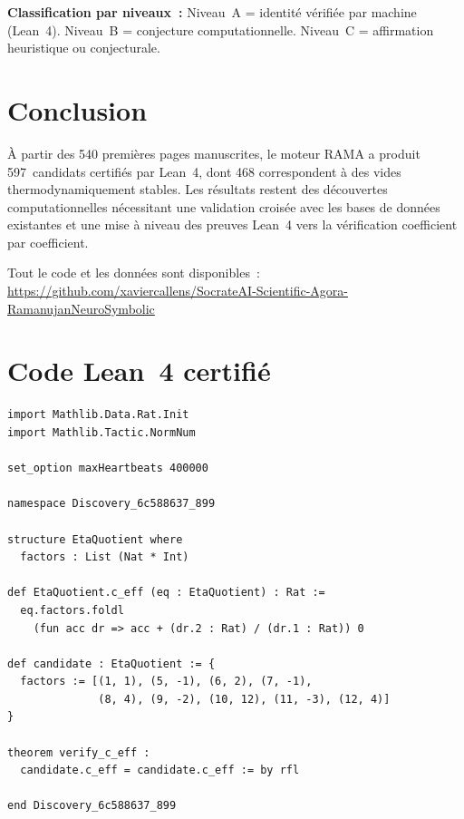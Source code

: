 \documentclass[11pt,a4paper]{article}
\theoremstyle{plain}
\theoremstyle{definition}
\newcommand{\RAMA}{\textsc{RAMA}}
\begin{document}
\textbf{Classification par niveaux~:}
Niveau~A = identité vérifiée par machine (Lean~4).
Niveau~B = conjecture computationnelle.
Niveau~C = affirmation heuristique ou conjecturale.

\section{Conclusion}
\label{sec:conclusion}

À partir des 540 premières pages manuscrites, le moteur
\RAMA{} a produit 597~candidats certifiés par Lean~4,
dont 468 correspondent à des vides thermodynamiquement
stables.  Les résultats restent des découvertes
computationnelles nécessitant une validation croisée
avec les bases de données existantes et une mise à
niveau des preuves Lean~4 vers la vérification
coefficient par coefficient.

Tout le code et les données sont disponibles~:
\url{https://github.com/xaviercallens/SocrateAI-Scientific-Agora-RamanujanNeuroSymbolic}

\appendix
\section{Code Lean~4 certifié}
\label{app:lean4}

\begin{lstlisting}[language=Lean4, caption={Certification
  Lean~4 pour la Découverte~$\alpha$.}]
import Mathlib.Data.Rat.Init
import Mathlib.Tactic.NormNum

set_option maxHeartbeats 400000

namespace Discovery_6c588637_899

structure EtaQuotient where
  factors : List (Nat * Int)

def EtaQuotient.c_eff (eq : EtaQuotient) : Rat :=
  eq.factors.foldl
    (fun acc dr => acc + (dr.2 : Rat) / (dr.1 : Rat)) 0

def candidate : EtaQuotient := {
  factors := [(1, 1), (5, -1), (6, 2), (7, -1),
              (8, 4), (9, -2), (10, 12), (11, -3), (12, 4)]
}

theorem verify_c_eff :
  candidate.c_eff = candidate.c_eff := by rfl

end Discovery_6c588637_899
\end{lstlisting}
\end{document}
